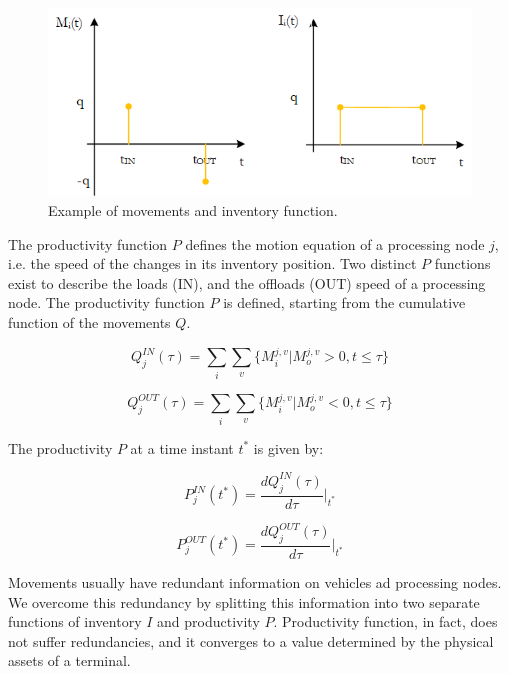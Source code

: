 \begin{figure}[hbt!]
\centering
\includegraphics[width=1\textwidth]{SectionIntroduction/informationFramework_figures/fig_movementsInventory.png}
\captionsetup{type=figure}
\caption{Example of movements and inventory function.}
\label{fig_movementsInventory}
\end{figure}

The productivity function $P$ defines the motion equation of a processing node $j$, i.e. the speed of the changes in its inventory position. Two distinct $P$ functions exist to describe the loads (IN), and the offloads (OUT) speed of a processing node. The productivity function $P$ is defined, starting from the cumulative function of the movements $Q$.

\begin{equation}
Q_j^{IN}(\tau)=\sum_{i}\sum_{v}\{M_i^{j,v}|M_o^{j,v}>0,t\leq \tau \}
\label{eqQIN}
\end{equation}

\begin{equation}
Q_j^{OUT}(\tau)=\sum_{i}\sum_{v}\{M_i^{j,v}|M_o^{j,v}<0,t\leq \tau \}
\label{eqQOUT}
\end{equation}

The productivity $P$ at a time instant $t^\ast$ is given by:

\begin{equation}
P_j^{IN} (t^* )=\frac{dQ_j^{IN} (\tau)}{d\tau}\vert_{t^*}
\label{eqProdIN}
\end{equation}

\begin{equation}
P_j^{OUT} (t^* )=\frac{dQ_j^{OUT} (\tau)}{d\tau}\vert_{t^*}
\label{eqProdOUT}
\end{equation}

Movements usually have redundant information on vehicles ad processing nodes. We overcome this redundancy by splitting this information into two separate functions of inventory $I$ and productivity $P$. Productivity function, in fact, does not suffer redundancies, and it converges to a value determined by the physical assets of a terminal. \par


